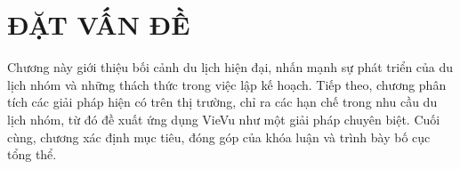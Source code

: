 \chapter{ĐẶT VẤN ĐỀ}
Chương này giới thiệu bối cảnh du lịch hiện đại, nhấn mạnh sự phát triển của du lịch nhóm và những thách thức trong việc lập kế hoạch. Tiếp theo, chương phân tích các giải pháp hiện có trên thị trường, chỉ ra các hạn chế trong nhu cầu du lịch nhóm, từ đó đề xuất ứng dụng VieVu như một giải pháp chuyên biệt. Cuối cùng, chương xác định mục tiêu, đóng góp của khóa luận và trình bày bố cục tổng thể.




